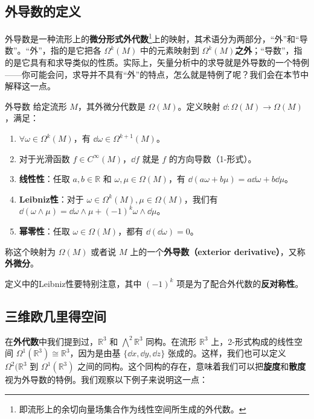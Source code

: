 

\subsection{外导数的定义}

外导数是一种流形上的\textbf{微分形式外代数}\footnote{即流形上的余切向量场集合作为线性空间所生成的外代数。}上的映射，其术语分为两部分，“外”和“导数”。“外”，指的是它把各 $\Omega^k(M)$ 中的元素映射到 $\Omega^k(M)$\textbf{之外}；“导数”，指的是它具有和求导类似的性质。实际上，矢量分析中的求导就是外导数的一个特例——你可能会问，求导并不具有“外”的特点，怎么就是特例了呢？我们会在本节中解释这一点。

\begin{definition}{外导数}\label{def_ExtDer_1}
给定流形 $M$，其外微分代数是 $\Omega (M)$。定义映射 $\dd:\Omega (M)\rightarrow\Omega (M)$，满足：
\begin{enumerate}
\item $\forall \omega\in\Omega^k(M)$，有 $\dd \omega\in\Omega^{k+1}(M)$。
\item 对于光滑函数 $f\in C^\infty(M)$，$\dd f$ 就是 $f$ 的方向导数（1-形式）。
\item \textbf{线性性}：任取 $a, b\in \mathbb{R}$ 和 $\omega, \mu\in\Omega(M)$，有 $\dd(a\omega+b\mu)=a\dd\omega+b\dd\mu$。
\item \textbf{Leibniz性}：对于 $\omega\in\Omega^k(M), \mu\in\Omega(M)$，我们有 $\dd(\omega\wedge\mu)=\dd\omega\wedge\mu+(-1)^k\omega\wedge\dd\mu$。
\item \textbf{幂零性}：任取 $\omega\in\Omega(M)$，都有 $\dd(\dd\omega)=0$。
\end{enumerate}
称这个映射为 $\Omega (M)$ 或者说 $M$ 上的一个\textbf{外导数（exterior derivative）}，又称\textbf{外微分}。
\end{definition}

定义中的Leibniz性要特别注意，其中 $(-1)^k$ 项是为了配合外代数的\textbf{反对称性}。



\subsection{三维欧几里得空间}

在\textbf{外代数}中我们提到过，$\mathbb{R}^3$ 和 $\bigwedge^2\mathbb{R}^3$ 同构。在流形 $\mathbb{R}^3$ 上，2-形式构成的线性空间 $\Omega^1(\mathbb{R}^3)\cong\mathbb{R}^3$，因为是由基 $\{\dd x, \dd y, \dd z\}$ 张成的。这样，我们也可以定义 $\Omega^2(\mathbb{R}^3$ 到 $\Omega^1(\mathbb{R}^3)$ 之间的同构。这个同构的存在，意味着我们可以把\textbf{旋度}和\textbf{散度}视为外导数的特例。我们观察以下例子来说明这一点：


